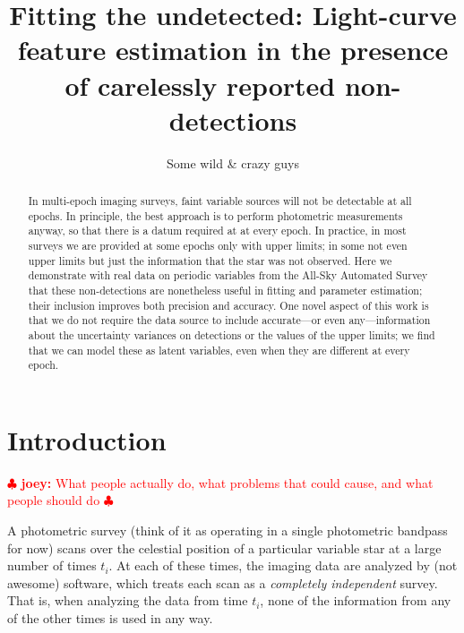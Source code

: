 \documentclass[12pt,preprint]{aastex}
\newcommand{\joey}[1] { \textcolor{red} {
\ensuremath{\clubsuit} {\bf joey:}  {#1}
\ensuremath{\clubsuit} } }%
\begin{document}

\shortauthors{}
\title{Fitting the undetected:  Light-curve feature estimation in the presence of carelessly reported non-detections}
\author{
Some wild \& crazy guys
}
%



\begin{abstract}
In multi-epoch imaging surveys, faint variable sources will not be
detectable at all epochs.  In principle, the best approach is to
perform photometric measurements anyway, so that there is a datum
required at at every epoch.  In practice, in most surveys we are
provided at some epochs only with upper limits; in some not even upper
limits but just the information that the star was not observed.  Here
we demonstrate with real data on periodic variables from the All-Sky
Automated Survey that these non-detections are nonetheless useful in
fitting and parameter estimation; their inclusion improves both
precision and accuracy.  One novel aspect of this work is that we do
not require the data source to include accurate---or even
any---information about the uncertainty variances on detections or the
values of the upper limits; we find that we can model these as latent
variables, even when they are different at every epoch.
\end{abstract}


\section{Introduction}
\label{sec:intro}

\joey{What people actually do, what problems that could cause, and what people should do}

A photometric survey (think of it as operating in a single photometric
bandpass for now) scans over the celestial position of a particular
variable star at a large number of times $t_i$.  At each of these
times, the imaging data are analyzed by (not awesome) software, which
treats each scan as a \emph{completely independent} survey.  That is,
when analyzing the data from time $t_i$, none of the information from
any of the other times is used in any way.
\end{document}
